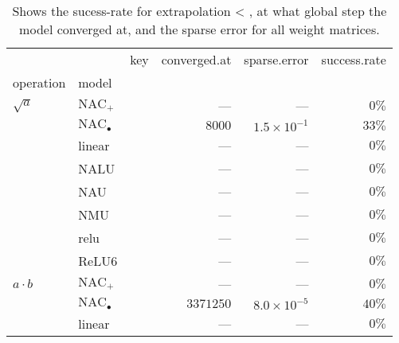 \begin{table}[H]
\centering
\caption{Shows the sucess-rate for extrapolation < \epsilon, at what global step the model converged at, and the sparse error for all weight matrices.} 
\begin{tabular}{lll |rrr}
  \hline
                      &                            & key & \multicolumn{1}{l}{          converged.at} & \multicolumn{1}{l}{          sparse.error} & \multicolumn{1}{l}{          success.rate} \\ 
  operation            & model                      &     & \multicolumn{1}{l}{                      } & \multicolumn{1}{l}{                      } & \multicolumn{1}{l}{                      } \\ 
   \hline
${\sqrt{a}}$        & ${\mathrm{NAC}_{+}}$      &     & ---                   &     ---               & $0\%$                \\ 
                       & ${\mathrm{NAC}_\bullet}$ &     & $8000$                & $1.5 \times 10^{-1}$ & $33\%$               \\ 
                       & linear                     &     & ---                   &     ---               & $0\%$                \\ 
                       & NALU                       &     & ---                   &     ---               & $0\%$                \\ 
                       & NAU                        &     & ---                   &     ---               & $0\%$                \\ 
                       & NMU                        &     & ---                   &     ---               & $0\%$                \\ 
                       & relu                       &     & ---                   &     ---               & $0\%$                \\ 
                       & ReLU6                      &     & ---                   &     ---               & $0\%$                \\ 
  ${a \cdot b}$       & ${\mathrm{NAC}_{+}}$      &     & ---                   &     ---               & $0\%$                \\ 
                       & ${\mathrm{NAC}_\bullet}$ &     & $3371250$             & $8.0 \times 10^{-5}$ & $40\%$               \\ 
                       & linear                     &     & ---                   &     ---               & $0\%$                \\ 

\end{tabular}
\end{table}
